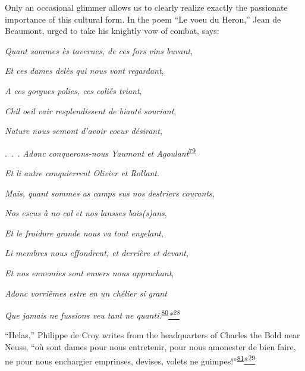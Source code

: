 Only an occasional glimmer allows us to clearly realize exactly the
passionate importance of this cultural form. In the poem ``Le voeu du
Heron,'' Jean de Beaumont, urged to take his knightly vow of combat,
says:

\emph{Quant sommes ès tavernes, de ces fors vins buvant},

\emph{Et ces dames delès qui nous vont regardant},

\emph{A ces gorgues polies, ces coliés triant},

\emph{Chil oeil vair resplendissent de biauté souriant},

\emph{Nature nous semont d'avoir coeur désirant},

.~.~. \emph{Adonc conquerons-nous Yaumont et
Agoulant}\textsuperscript{\protect\hypertarget{10_Chapter_Three__THE_HEROIC_DREAM.xhtmlux5cux23id_1776}{\protect\hyperlink{23_NOTES.xhtmlux5cux23id_1777}{79}}}

\emph{Et li autre conquierrent Olivier et Rollant}.

\emph{Mais, quant sommes as camps sus nos destriers courants},

\emph{Nos escus à no col et nos lansses bais(s)ans},

\emph{Et le froidure grande nous va tout engelant},

\emph{Li membres nous effondrent, et derrière et devant},

\emph{Et nos ennemies sont envers nous approchant},

\emph{Adonc vorrièmes estre en un chélier si grant}

\emph{Que jamais ne fussions veu tant ne
quanti}.\textsuperscript{\protect\hypertarget{10_Chapter_Three__THE_HEROIC_DREAM.xhtmlux5cux23id_1774}{\protect\hyperlink{23_NOTES.xhtmlux5cux23id_1775}{80}}}\emph{\protect\hypertarget{10_Chapter_Three__THE_HEROIC_DREAM.xhtmlux5cux23id_2517}{\protect\hyperlink{23_NOTES.xhtmlux5cux23id_2518}{*\textsuperscript{28}}}}

``Helas,'' Philippe de Croy writes from the headquarters of Charles the
Bold near Neuss, ``où sont dames pour nous entretenir,
\protect\hypertarget{10_Chapter_Three__THE_HEROIC_DREAM.xhtmlux5cux23page_88}{}{}pour
nous amonester de bien faire, ne pour nous enchargier emprinses,
devises, volets ne
guimpes!''\textsuperscript{\protect\hypertarget{10_Chapter_Three__THE_HEROIC_DREAM.xhtmlux5cux23id_1772}{\protect\hyperlink{23_NOTES.xhtmlux5cux23id_1773}{81}}}\protect\hypertarget{10_Chapter_Three__THE_HEROIC_DREAM.xhtmlux5cux23id_2519}{\protect\hyperlink{23_NOTES.xhtmlux5cux23id_2520}{*\textsuperscript{29}}}

